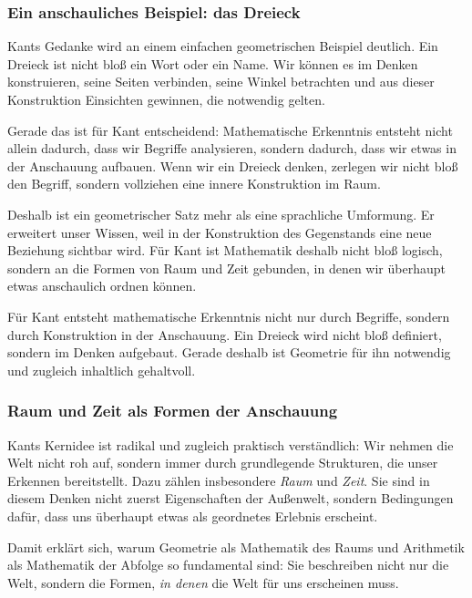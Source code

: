\subsubsection*{Ein anschauliches Beispiel: das Dreieck}

Kants Gedanke wird an einem einfachen geometrischen Beispiel deutlich.
Ein Dreieck ist nicht bloß ein Wort oder ein Name.
Wir können es im Denken konstruieren,
seine Seiten verbinden,
seine Winkel betrachten
und aus dieser Konstruktion Einsichten gewinnen,
die notwendig gelten.

Gerade das ist für Kant entscheidend:
Mathematische Erkenntnis entsteht nicht allein dadurch,
dass wir Begriffe analysieren,
sondern dadurch,
dass wir etwas in der Anschauung aufbauen.
Wenn wir ein Dreieck denken,
zerlegen wir nicht bloß den Begriff,
sondern vollziehen eine innere Konstruktion im Raum.

Deshalb ist ein geometrischer Satz mehr
als eine sprachliche Umformung.
Er erweitert unser Wissen,
weil in der Konstruktion des Gegenstands
eine neue Beziehung sichtbar wird.
Für Kant ist Mathematik deshalb nicht bloß logisch,
sondern an die Formen von Raum und Zeit gebunden,
in denen wir überhaupt etwas anschaulich ordnen können.

\begin{DidacticBox}
	\label{box:kant-dreieck}
	\small
	Für Kant entsteht mathematische Erkenntnis nicht nur durch Begriffe,
	sondern durch Konstruktion in der Anschauung.
	Ein Dreieck wird nicht bloß definiert,
	sondern im Denken aufgebaut.
	Gerade deshalb ist Geometrie für ihn notwendig
	und zugleich inhaltlich gehaltvoll.
\end{DidacticBox}

\subsubsection*{Raum und Zeit als Formen der Anschauung}

Kants Kernidee ist radikal
und zugleich praktisch verständlich:
Wir nehmen die Welt nicht roh auf,
sondern immer durch grundlegende Strukturen,
die unser Erkennen bereitstellt.
Dazu zählen insbesondere \emph{Raum} und \emph{Zeit}.
Sie sind in diesem Denken nicht zuerst Eigenschaften der Außenwelt,
sondern Bedingungen dafür,
dass uns überhaupt etwas als geordnetes Erlebnis erscheint.

Damit erklärt sich,
warum Geometrie als Mathematik des Raums
und Arithmetik als Mathematik der Abfolge
so fundamental sind:
Sie beschreiben nicht nur die Welt,
sondern die Formen,
\emph{in denen} die Welt für uns erscheinen muss.

